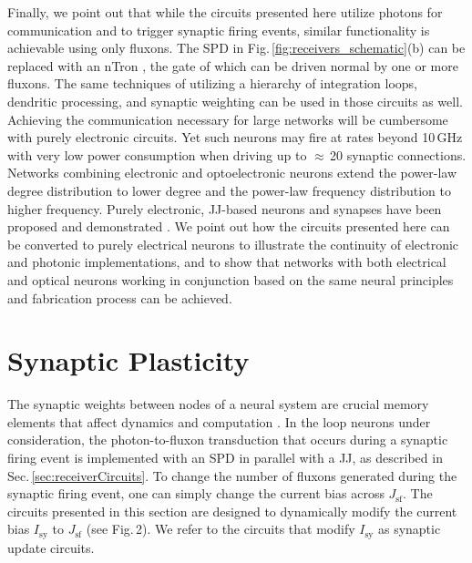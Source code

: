 \documentclass[twocolumn]{article}
\begin{document}
Finally, we point out that while the circuits presented here utilize photons for communication and to trigger synaptic firing events, similar functionality is achievable using only fluxons. The SPD in Fig.\,\ref{fig:receivers_schematic}(b) can be replaced with an nTron \cite{mcbe2014}, the gate of which can be driven normal by one or more fluxons. The same techniques of utilizing a hierarchy of integration loops, dendritic processing, and synaptic weighting can be used in those circuits as well. Achieving the communication necessary for large networks \cite{sh2018_ICRC} will be cumbersome with purely electronic circuits. Yet such neurons may fire at rates beyond 10\,GHz with very low power consumption when driving up to $\approx$\,20 synaptic connections. Networks combining electronic and optoelectronic neurons extend the power-law degree distribution to lower degree and the power-law frequency distribution to higher frequency. Purely electronic, JJ-based neurons and synapses have been proposed \cite{hias2007,crsc2010,ru2016} and demonstrated \cite{segu2014,scdo2018}. We point out how the circuits presented here can be converted to purely electrical neurons to illustrate the continuity of electronic and photonic implementations, and to show that networks with both electrical and optical neurons working in conjunction based on the same neural principles and fabrication process can be achieved.

\section{\label{sec:synapticPlasticity}Synaptic Plasticity}
The synaptic weights between nodes of a neural system are crucial memory elements that affect dynamics and computation \cite{abre2004,bu2006,siqu2007,haah2015}. In the loop neurons under consideration, the photon-to-fluxon transduction that occurs during a synaptic firing event is implemented with an SPD in parallel with a JJ, as described in Sec.\,\ref{sec:receiverCircuits}. To change the number of fluxons generated during the synaptic firing event, one can simply change the current bias across $J_{\mathrm{sf}}$. The circuits presented in this section are designed to dynamically modify the current bias $I_{\mathrm{sy}}$ to $J_{\mathrm{sf}}$ (see Fig.\,2). We refer to the circuits that modify $I_{\mathrm{sy}}$ as synaptic update circuits.
\end{document}
